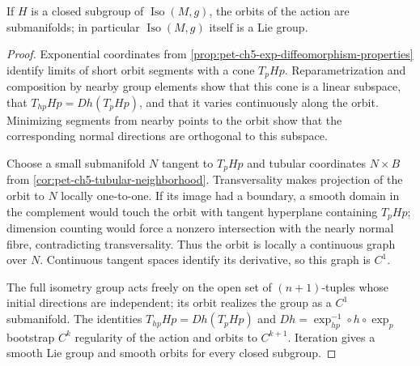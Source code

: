 \begin{theorem}
  \label{thm:pet-ch5-myers-steenrod-lie-group}
  If $H$ is a closed subgroup of $\operatorname{Iso}(M,g)$, the orbits of the
  action are submanifolds; in particular $\operatorname{Iso}(M,g)$ itself is a Lie
  group.
\end{theorem}
\begin{proof}
  \sketch
  Exponential coordinates from
  \cref{prop:pet-ch5-exp-diffeomorphism-properties} identify limits of short orbit
  segments with a cone $T_pHp$.  Reparametrization and composition by nearby group
  elements show that this cone is a linear subspace, that
  $T_{hp}Hp=Dh(T_pHp)$, and that it varies continuously along the orbit.
  Minimizing segments from nearby points to the orbit show that the corresponding
  normal directions are orthogonal to this subspace.

  Choose a small submanifold $N$ tangent to $T_pHp$ and tubular coordinates
  $N\times B$ from \cref{cor:pet-ch5-tubular-neighborhood}.  Transversality makes
  projection of the orbit to $N$ locally one-to-one.  If its image had a boundary,
  a smooth domain in the complement would touch the orbit with tangent hyperplane
  containing $T_pHp$; dimension counting would force a nonzero intersection with
  the nearly normal fibre, contradicting transversality.  Thus the orbit is locally
  a continuous graph over $N$.  Continuous tangent spaces identify its derivative,
  so this graph is $C^1$.

  The full isometry group acts freely on the open set of $(n+1)$-tuples whose
  initial directions are independent; its orbit realizes the group as a $C^1$
  submanifold.  The identities $T_{hp}Hp=Dh(T_pHp)$ and
  $Dh=\exp_{hp}^{-1}\circ h\circ\exp_p$ bootstrap $C^k$ regularity of the action and
  orbits to $C^{k+1}$.  Iteration gives a smooth Lie group and smooth orbits for
  every closed subgroup.
\end{proof}

